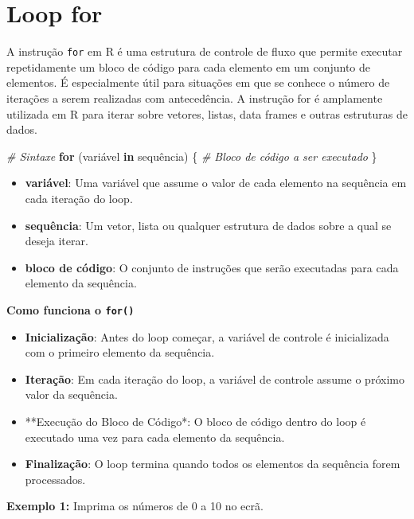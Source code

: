 \documentclass[
]{book}
\newenvironment{Shaded}{\begin{snugshade}}{\end{snugshade}}
\newcommand{\CommentTok}[1]{\textcolor[rgb]{0.56,0.35,0.01}{\textit{#1}}}
\newcommand{\ControlFlowTok}[1]{\textcolor[rgb]{0.13,0.29,0.53}{\textbf{#1}}}
\newcommand{\NormalTok}[1]{#1}
\theoremstyle{definition}
\theoremstyle{definition}
\theoremstyle{definition}
\theoremstyle{definition}
\theoremstyle{remark}
\begin{document}
\chapter{Loop for}\label{loop-for}

A instrução \texttt{for} em R é uma estrutura de controle de fluxo que permite executar repetidamente um bloco de código para cada elemento em um conjunto de elementos. É especialmente útil para situações em que se conhece o número de iterações a serem realizadas com antecedência. A instrução for é amplamente utilizada em R para iterar sobre vetores, listas, data frames e outras estruturas de dados.

\begin{Shaded}
\begin{Highlighting}[]
\CommentTok{\# Sintaxe}
\ControlFlowTok{for}\NormalTok{ (variável }\ControlFlowTok{in}\NormalTok{ sequência) \{}
  \CommentTok{\# Bloco de código a ser executado}
\NormalTok{\}}
\end{Highlighting}
\end{Shaded}

\begin{itemize}
\item
  \textbf{variável}: Uma variável que assume o valor de cada elemento na sequência em cada iteração do loop.
\item
  \textbf{sequência}: Um vetor, lista ou qualquer estrutura de dados sobre a qual se deseja iterar.
\item
  \textbf{bloco de código}: O conjunto de instruções que serão executadas para cada elemento da sequência.
\end{itemize}

\textbf{Como funciona o \texttt{for()}}

\begin{itemize}
\item
  \textbf{Inicialização}: Antes do loop começar, a variável de controle é inicializada com o primeiro elemento da sequência.
\item
  \textbf{Iteração}: Em cada iteração do loop, a variável de controle assume o próximo valor da sequência.
\item
  **Execução do Bloco de Código*: O bloco de código dentro do loop é executado uma vez para cada elemento da sequência.
\item
  \textbf{Finalização}: O loop termina quando todos os elementos da sequência forem processados.
\end{itemize}

\textbf{Exemplo 1:} Imprima os números de 0 a 10 no ecrã.
\end{document}
